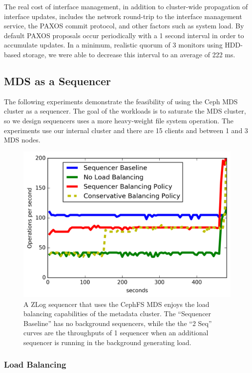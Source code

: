 \documentclass[10pt,twocolumn]{article}
\begin{document}
The real cost of interface management, in addition to cluster-wide propagation
of interface updates, includes the network round-trip to the interface
management service, the PAXOS commit protocol, and other factors such as system
load. By default PAXOS proposals occur periodically with a 1 second interval in
order to accumulate updates. In a minimum, realistic quorum of 3 monitors using
HDD-based storage, we were able to decrease this interval to an average of 222
ms.

\subsection{MDS as a Sequencer}

The following experiments demonstrate the feasibility of using the Ceph MDS
cluster as a sequencer. The goal of the workloads is to saturate the MDS
cluster, so we design sequencers uses a more heavy-weight file system
operation. The experiments use our internal cluster and there are 15 clients
and between 1 and 3 MDS nodes. 

\begin{figure}[t!]
\centering
\includegraphics{figures/mantle-seq-thruput.png}
\caption{A ZLog sequencer that uses the CephFS MDS enjoys the load balancing
capabilities of the metadata cluster. The ``Sequencer Baseline'' has no
background sequencers, while the the ``2 Seq'' curves are the throughputs
of 1 sequencer when an additional sequencer is running in the background
generating load.}\label{fig:mantle-seq-thruput}
\end{figure}

\subsubsection{Load Balancing}
\end{document}
